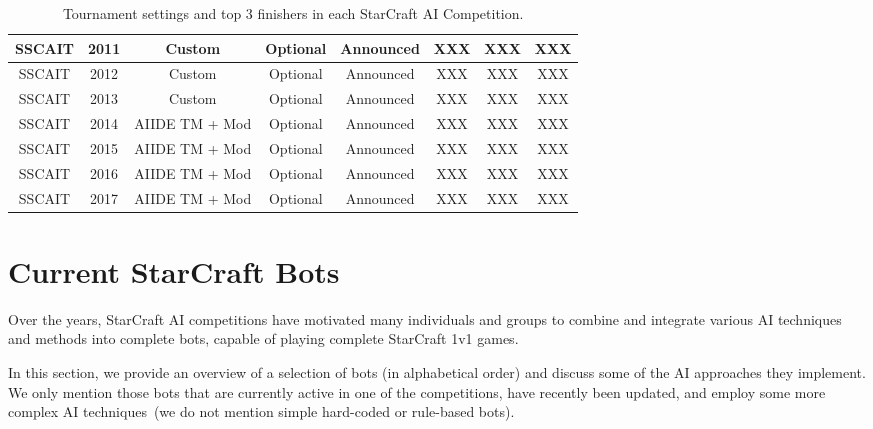 \begin{table}[t]
\begin{center}
\begin{tabular} {| c | c | c c c | c c c |}
 SSCAIT & 2011 & Custom & Optional & Announced & XXX & XXX & XXX \\
 \hline
 SSCAIT & 2012 & Custom & Optional & Announced & XXX & XXX & XXX \\
 \hline
 SSCAIT & 2013 & Custom & Optional & Announced & XXX & XXX & XXX \\
 \hline
 SSCAIT & 2014 & AIIDE TM + Mod & Optional & Announced & XXX & XXX & XXX \\
 \hline
 SSCAIT & 2015 & AIIDE TM + Mod & Optional & Announced & XXX & XXX & XXX \\
 \hline
 SSCAIT & 2016 & AIIDE TM + Mod & Optional & Announced & XXX & XXX & XXX \\
 \hline
 SSCAIT & 2017 & AIIDE TM + Mod & Optional & Announced & XXX & XXX & XXX \\
 \hline
 \end{tabular}
 \end{center}  
 \caption{Tournament settings and top 3 finishers in each StarCraft AI Competition.}
 \label{tableTournaments}
\end{table} 

\section{Current StarCraft Bots}\label{secBots}

Over the years, StarCraft AI competitions have motivated many individuals and groups to combine and integrate various AI techniques and methods into complete bots, capable of playing complete StarCraft 1v1 games. 

In this section, we provide an overview of a selection of bots (in alphabetical order) and discuss some of the AI approaches they implement. We only mention those bots that are currently active in one of the competitions, have recently been updated, and employ some more complex AI techniques~(we do not mention simple hard-coded or rule-based bots). 

